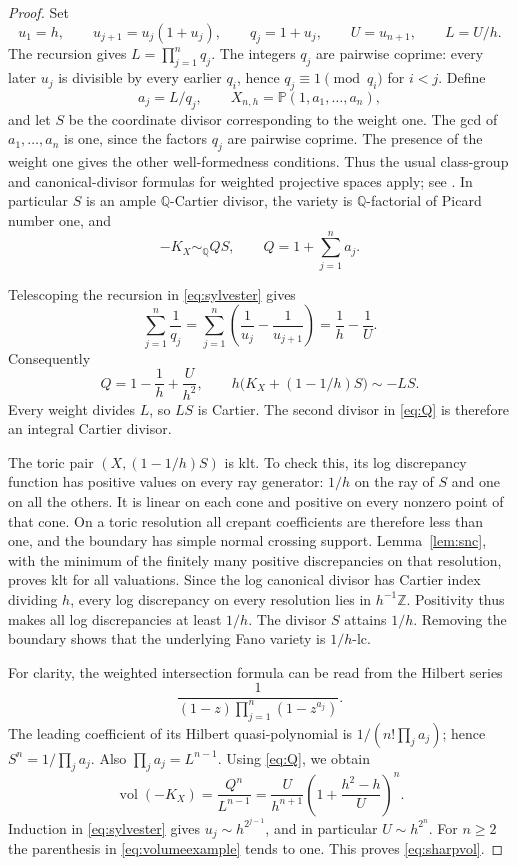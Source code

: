\documentclass[11pt,reqno]{amsart}
\numberwithin{equation}{section}
\theoremstyle{definition}
\theoremstyle{remark}
\newcommand{\Q}{\mathbb Q}
\newcommand{\Z}{\mathbb Z}
\newcommand{\PP}{\mathbb P}
\newcommand{\simq}{\sim_{\Q}}
\newcommand{\vol}{\operatorname{vol}}
\begin{document}
\begin{proof}
Set
\begin{equation}\label{eq:sylvester}
 u_1=h,\qquad u_{j+1}=u_j(1+u_j),\qquad
 q_j=1+u_j,\qquad U=u_{n+1},\qquad L=U/h.
\end{equation}
The recursion gives $L=\prod_{j=1}^n q_j$. The integers $q_j$ are pairwise coprime: every later $u_j$ is divisible by every earlier $q_i$, hence $q_j\equiv1\pmod{q_i}$ for $i<j$. Define
\[
 a_j=L/q_j,\qquad X_{n,h}=\PP(1,a_1,\ldots,a_n),
\]
and let $S$ be the coordinate divisor corresponding to the weight one. The gcd of $a_1,\ldots,a_n$ is one, since the factors $q_j$ are pairwise coprime. The presence of the weight one gives the other well-formedness conditions. Thus the usual class-group and canonical-divisor formulas for weighted projective spaces apply; see \cite{Dolg82}. In particular $S$ is an ample $\Q$-Cartier divisor, the variety is $\Q$-factorial of Picard number one, and
\[
 -K_X\simq QS,\qquad Q=1+\sum_{j=1}^n a_j.
\]

Telescoping the recursion in \eqref{eq:sylvester} gives
\[
 \sum_{j=1}^n\frac1{q_j}
 =\sum_{j=1}^n\left(\frac1{u_j}-\frac1{u_{j+1}}\right)
 =\frac1h-\frac1U.
\]
Consequently
\begin{equation}\label{eq:Q}
 Q=1-\frac1h+\frac{U}{h^2},\qquad
 h\bigl(K_X+(1-1/h)S\bigr)\sim-LS.
\end{equation}
Every weight divides $L$, so $LS$ is Cartier. The second divisor in \eqref{eq:Q} is therefore an integral Cartier divisor.

The toric pair $(X,(1-1/h)S)$ is klt. To check this, its log discrepancy function has positive values on every ray generator: $1/h$ on the ray of $S$ and one on all the others. It is linear on each cone and positive on every nonzero point of that cone. On a toric resolution all crepant coefficients are therefore less than one, and the boundary has simple normal crossing support. Lemma~\ref{lem:snc}, with the minimum of the finitely many positive discrepancies on that resolution, proves klt for all valuations. Since the log canonical divisor has Cartier index dividing $h$, every log discrepancy on every resolution lies in $h^{-1}\Z$. Positivity thus makes all log discrepancies at least $1/h$. The divisor $S$ attains $1/h$. Removing the boundary shows that the underlying Fano variety is $1/h$-lc.

For clarity, the weighted intersection formula can be read from the Hilbert series
\[
 \frac{1}{(1-z)\prod_{j=1}^n(1-z^{a_j})}.
\]
The leading coefficient of its Hilbert quasi-polynomial is $1/(n!\prod_j a_j)$; hence $S^n=1/\prod_j a_j$. Also $\prod_j a_j=L^{n-1}$. Using \eqref{eq:Q}, we obtain
\begin{equation}\label{eq:volumeexample}
 \vol(-K_X)=\frac{Q^n}{L^{n-1}}
 =\frac{U}{h^{n+1}}
 \left(1+\frac{h^2-h}{U}\right)^n.
\end{equation}
Induction in \eqref{eq:sylvester} gives $u_j\sim h^{2^{j-1}}$, and in particular $U\sim h^{2^n}$. For $n\ge2$ the parenthesis in \eqref{eq:volumeexample} tends to one. This proves \eqref{eq:sharpvol}.


\end{proof}
\end{document}
